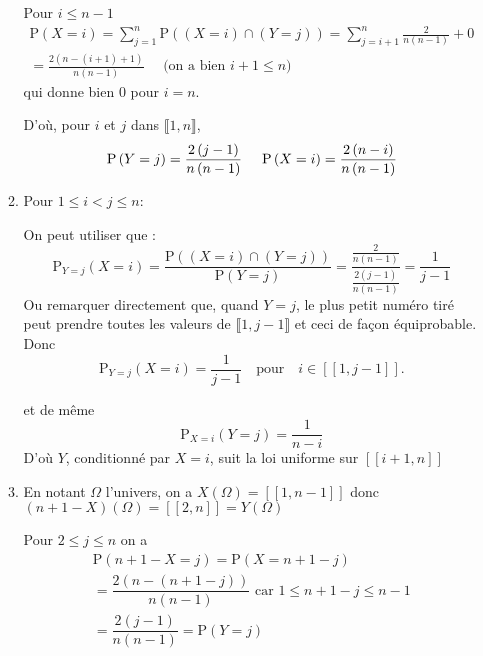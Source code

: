 \begin{enumerate}
\begin{enumerate}
Pour $i\leq n-1$%
\begin{multline*}
\mathrm{P}\left( X=i\right) 
 = \sum_{j=1}^{n}\mathrm{P}\left( (X=i)\cap(Y=j)\right) 
 = \sum_{j=i+1}^{n}\frac{2}{n\left( n-1\right) }+0 \\
 = \frac{2\left( n-\left( i+1\right) +1\right) }{n\left( n-1\right) }\quad\text{ (on a bien }i+1\leq n)
\end{multline*}
qui donne bien $0$ pour $i=n.$

D'où, pour $i$ et $j$ dans $\llbracket 1,n \rrbracket$,
\begin{displaymath}
\mathrm{P}\left( Y=j\right) 
= \dfrac{2\left( j-1\right) }{n\left(n-1\right) } \hspace{0.5cm} \mathrm{P}\left( X=i\right) =\dfrac{2\left( n-i\right) }{n\left( n-1\right) }  
\end{displaymath}


\item Pour $1\leqslant i<j\leqslant n:$

On peut utiliser que :
$$
\mathrm{P}_{Y=j}\left( X=i\right) =\frac{\mathrm{P}\left(( X=i)\cap( Y=j)\right) 
}{\mathrm{P}\left( Y=j\right) }=\frac{\frac{2}{n\left( n-1\right) }}{\frac{2\left( j-1\right) }{n\left( n-1\right) }}=\frac{1}{j-1}
$$
Ou remarquer directement que, quand $Y=j$, le plus petit numéro tiré peut prendre toutes les valeurs de $\llbracket 1,j-1 \rrbracket$ et ceci de fa\c con \'equiprobable.\\
Donc  $$\mathrm{P}_{Y=j}\left(
X=i\right) =\frac{1}{j-1}\quad\text{pour}\quad i\in \left[ \!\left[ 1,j-1\right]\! \right]
. $$



et de m\^eme 
\begin{equation*}
\mathrm{P}_{X=i}\left( Y=j\right) =\frac{1}{n-i}
\end{equation*}
D'où $Y$, conditionné par $X=i$, suit la loi uniforme sur  $\left[\! \left[
i+1,n\right]\! \right] $ 
\item En notant $\Omega$ l'univers, on a $X\left( \Omega \right) =\left[\! \left[ 1,n-1\right] \! \right] $
donc $\left( n+1-X\right) \left( \Omega \right) =\left[\!  \left[ 2,n\right] \! 
\right] =Y\left( \Omega \right) $

Pour $2\leqslant j\leqslant n$ on a 
\begin{multline*}
\mathrm{P}\left( n+1-X=j\right) 
 = \mathrm{P}\left( X=n+1-j\right) \\
 = \dfrac{2\left( n-\left( n+1-j\right) \right) }{n\left( n-1\right) }\text{ car }1\leq n+1-j\leq n-1 \\
 = \dfrac{2\left( j-1\right) }{n\left( n-1\right) }=\mathrm{P}\left(Y=j\right)
\end{multline*}


\end{enumerate}
\end{enumerate}
